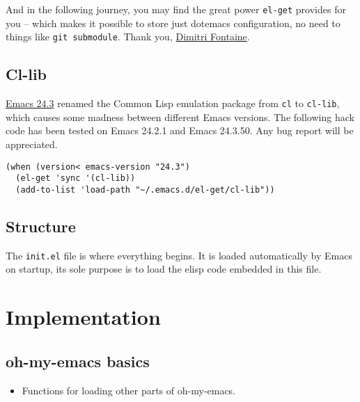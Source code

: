 \documentclass[11pt]{article}
\begin{document}
And in the following journey, you may find the great power \texttt{el-get} provides
for you -- which makes it possible to store just dotemacs configuration, no
need to things like \texttt{git submodule}. Thank you, \href{http://tapoueh.org/}{Dimitri Fontaine}.

\subsection*{Cl-lib}
\label{sec-2-4}
\href{http://www.gnu.org/software/emacs/news/NEWS.24.3}{Emacs 24.3} renamed the Common Lisp emulation package from \texttt{cl} to \texttt{cl-lib},
which causes some madness between different Emacs versions. The following hack
code has been tested on Emacs 24.2.1 and Emacs 24.3.50. Any bug report will be
appreciated.

\begin{verbatim}
(when (version< emacs-version "24.3")
  (el-get 'sync '(cl-lib))
  (add-to-list 'load-path "~/.emacs.d/el-get/cl-lib"))
\end{verbatim}

\subsection*{Structure}
\label{sec-2-5}
The \texttt{init.el} file is where everything begins. It is loaded
automatically by Emacs on startup, its sole purpose is to load the
elisp code embedded in this file.

\section*{Implementation}
\label{sec-3}

\subsection*{oh-my-emacs basics}
\label{sec-3-1}
\begin{itemize}
\item Functions for loading other parts of oh-my-emacs.
\end{itemize}
\end{document}
